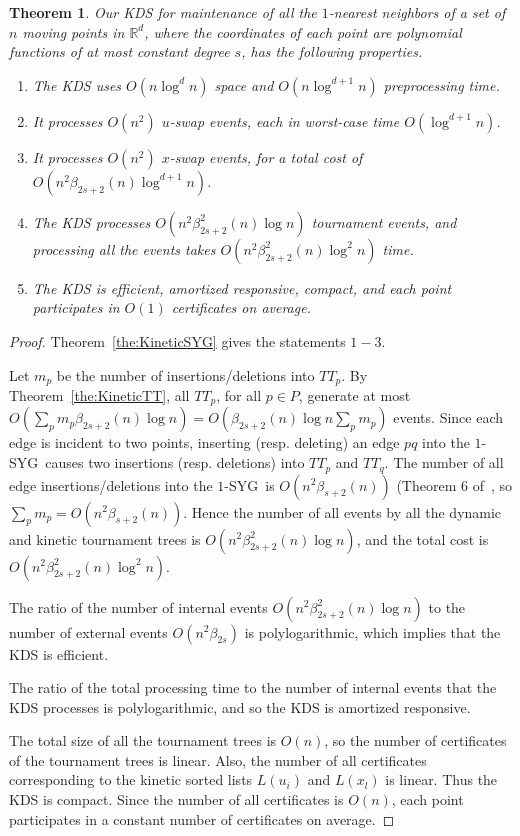 \documentclass[preprint,12pt]{elsarticle}
\def\1syg{\mbox{$1$-SYG}}
\newtheorem{theorem}{Theorem}[section]
\begin{document}
\begin{theorem}\label{the:KineticAllNN}
Our KDS for maintenance of all the $1$-nearest neighbors of a set of $n$ moving points in $\mathbb{R}^d$, where the coordinates of each point are polynomial functions of at most constant degree $s$, has the following properties. 
\begin{enumerate}
\item The KDS uses $O(n\log^d n)$ space and $O(n\log^{d+1} n)$ preprocessing time.
\item It processes $O(n^2)$ $u$-swap events, each in worst-case time $O(\log^{d+1} n)$.
\item It processes $O(n^2)$ $x$-swap events, for a total cost of $O(n^2\beta_{2s+2}(n)\log^{d+1} n)$.
\item The KDS processes $O(n^2\beta_{2s+2}^2(n)\log n)$ tournament events, and processing all the events takes $O(n^2\beta_{2s+2}^2(n)\log^2 n)$ time.
\item The KDS is efficient, amortized responsive, compact, and each point participates in $O(1)$ certificates on average.
\end{enumerate}
\end{theorem}
\begin{proof}
Theorem~\ref{the:KineticSYG} gives the statements $1-3$. 

Let  $m_p$ be the number of insertions/deletions into $TT_p$. By Theorem~\ref{the:KineticTT}, all $TT_p$, for all $p\in P$, generate at most $O(\sum_pm_p\beta_{2s+2}(n)\log n)=O(\beta_{2s+2}(n)\log n\sum_pm_p)$ events. Since each edge is incident to two points, inserting (resp. deleting) an edge $pq$ into the \1syg~causes two insertions (resp. deletions) into $TT_p$ and $TT_q$. The number of all edge insertions/deletions into the \1syg~is $O(n^2\beta_{s+2}(n))$ (Theorem 6 of~\cite{Rahmati2014}, so  $\sum_pm_p=O(n^2\beta_{s+2}(n))$. Hence the number of all events by all the dynamic and kinetic tournament trees is $O(n^2\beta^2_{2s+2}(n)\log n)$, and the total cost is $O(n^2\beta^2_{2s+2}(n)\log^2 n)$. 

The ratio of the number of internal events $O(n^2\beta^2_{2s+2}(n)\log n)$ to the number of external events $O(n^2\beta_{2s})$ is polylogarithmic, which implies that the KDS is efficient. 

The ratio of the total processing time to the number of internal events that the KDS processes is polylogarithmic, and so the KDS is amortized responsive.

The total size of all the tournament trees is $O(n)$, so the number of certificates of the tournament trees is linear. Also, the number of all certificates corresponding to the kinetic sorted lists $L(u_i)$ and $L(x_l)$ is linear. Thus the KDS is compact.  Since the number of all certificates is $O(n)$, each point participates in a constant number of certificates  on average.
\end{proof}
\end{document}
